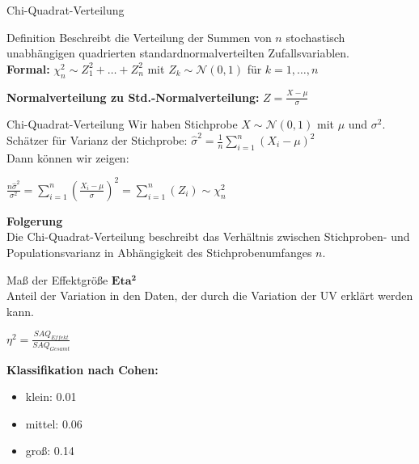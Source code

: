 \documentclass{beamer}
\begin{document}
	\begin{frame}{Chi-Quadrat-Verteilung}
		\begin{block}{Definition}
			Beschreibt die Verteilung der Summen von $n$ stochastisch unabhängigen quadrierten standardnormalverteilten Zufallsvariablen. \\ \vspace{2 ex}
			\textbf{Formal:} $\chi_n^2 \sim Z_1^2+ \dots + Z_n^2 $ mit $Z_k \sim \mathcal{N}(0,1)$ für $k=1, \dots , n$
		\end{block}
			\textbf{Normalverteilung zu Std.-Normalverteilung:} $Z = \frac{X-\mu}{\sigma}$ 
	\end{frame}
	
	\begin{frame}{Chi-Quadrat-Verteilung}
		Wir haben Stichprobe $X\sim \mathcal{N}(0,1)$ mit $\mu$ und $\sigma^2$.\\ \vspace{1ex} 
		Schätzer für Varianz der Stichprobe: $\hat{\sigma}^2 = \frac{1}{n} \sum_{i=1}^{n}(X_i-\mu)^2$ \\ \vspace{2ex}
		Dann können wir zeigen: \\
		\begin{center}
			$\frac{n\hat{\sigma}^2}{\sigma^2} = \sum_{i=1}^{n}(\frac{X_i-\mu}{\sigma})^2 =  \sum_{i=1}^{n}(Z_i) \sim \chi^2_n$
		\end{center}
		\textbf{Folgerung}\\
		Die Chi-Quadrat-Verteilung beschreibt das Verhältnis zwischen Stichproben- und Populationsvarianz in Abhängigkeit des Stichprobenumfanges $n$.
	\end{frame}
	
	
	\begin{frame}{Maß der Effektgröße}
		$\mathbf{Eta^2}$\\
		Anteil der Variation in den Daten, der durch die Variation der UV erklärt werden kann.\\
		\begin{center}
			$\eta^2 = \frac{SAQ_{Effekt}}{SAQ_{Gesamt}}$ 
		\end{center}
		\textbf{Klassifikation nach Cohen:}
		\begin{itemize}
			\item klein: 0.01
			\item mittel: 0.06
			\item groß: 0.14
		\end{itemize}
		
	\end{frame}
	
\end{document}
